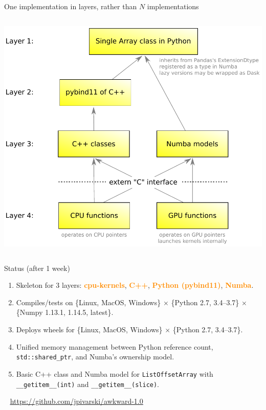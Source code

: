 \documentclass[aspectratio=169]{beamer}
\begin{document}
\begin{frame}{One implementation in layers, rather than $N$ implementations}
\vspace{0.4 cm}
\begin{columns}
\includegraphics[width=\linewidth]{awkward-1-0-layers.pdf}
\end{columns}
\end{frame}

\begin{frame}{Status (after 1 week)}
\vspace{0.5 cm}
\large
\begin{enumerate}\setlength{\itemsep}{0.35 cm}
\item Skeleton for 3 layers: \textcolor{darkorange}{\bf cpu-kernels}, \textcolor{darkorange}{\bf C++}, \textcolor{darkorange}{\bf Python (pybind11)}, \textcolor{darkorange}{\bf Numba}.
\item Compiles/tests on \{Linux, MacOS, Windows\} $\times$ \{Python 2.7, 3.4--3.7\} $\times$ \{Numpy 1.13.1, 1.14.5, latest\}.
\item Deploys wheels for \{Linux, MacOS, Windows\} $\times$ \{Python 2.7, 3.4--3.7\}.
\item Unified memory management between Python reference count, \texttt{std::shared_ptr}, and Numba's ownership model.
\item Basic C++ class and Numba model for \texttt{ListOffsetArray} with \texttt{__getitem__(int)} and \texttt{__getitem__(slice)}.
\end{enumerate}

\vspace{0.5 cm}
\mbox{ } \hfill \textcolor{blue}{\underline{\url{https://github.com/jpivarski/awkward-1.0}}} \hfill \mbox{ }
\end{frame}
\end{document}
